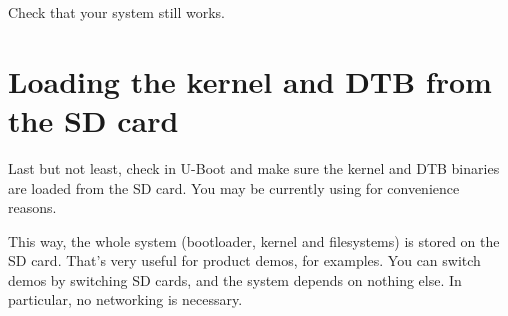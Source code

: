 Check that your system still works.

\section{Loading the kernel and DTB from the SD card}

Last but not least, check  in U-Boot and make sure
the kernel and DTB binaries are loaded from the SD card. You may
be currently using  for convenience reasons.

This way, the whole system (bootloader, kernel and filesystems) is
stored on the SD card. That's very useful for product demos, for
examples. You can switch demos by switching SD cards, and the
system depends on nothing else. In particular, no networking is
necessary.
